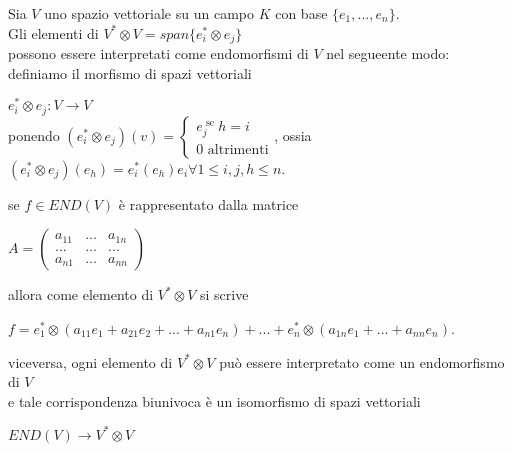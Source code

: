 \documentclass[a4paper,12pt]{article}
\theoremstyle{def}
\theoremstyle{prop}
\theoremstyle{esempio}
\theoremstyle{dimostrazione}
\theoremstyle{teo}
\theoremstyle{osservazione}
\begin{document}
Sia \(V\) uno spazio vettoriale su un campo \(K\) con base \(\{e_1,..., e_n\}\).\\
Gli elementi di \(V^* \otimes V = span\{e_i^* \otimes e_j\}\)\\
possono essere interpretati come endomorfismi di \(V\) nel segueente modo:\\
definiamo il morfismo di spazi vettoriali
\begin{center}
	\(e_i^* \otimes e_j : V \rightarrow V\)\\
	ponendo \((e_i^* \otimes e_j)(v) = \begin{cases}
		e_j^  \text{ se } h = i \\
		0 \text{ altrimenti}
	\end{cases}\), ossia \((e_i^* \otimes e_j)(e_h) = e_i^* (e_h) e_i \forall 1 \leq i,j,h \leq n\).
\end{center}
se \(f \in END(V)\) è rappresentato dalla matrice
\begin{center}
	\(A = \begin{pmatrix}
		a_{11} & ... & a_{1n} \\
		...    & ... & ...    \\
		a_{n1} & ... & a_{nn}
	\end{pmatrix}\)
\end{center}
allora come elemento di \(V^* \otimes V\) si scrive
\begin{center}
	\(f = e_1^* \otimes (a_{11}e_1 + a_{21}e_2 + ... + a_{n1}e_n) + ... + e_n^* \otimes (a_{1n}e_1 + ... + a_{nn}e_n)\).
\end{center}
viceversa, ogni elemento di \(V^* \otimes V\) può essere interpretato come un endomorfismo di \(V\)\\
e tale corrispondenza biunivoca è un isomorfismo di spazi vettoriali
\begin{center}
	\(END(V) \rightarrow V^* \otimes V\)
\end{center}
\end{document}
